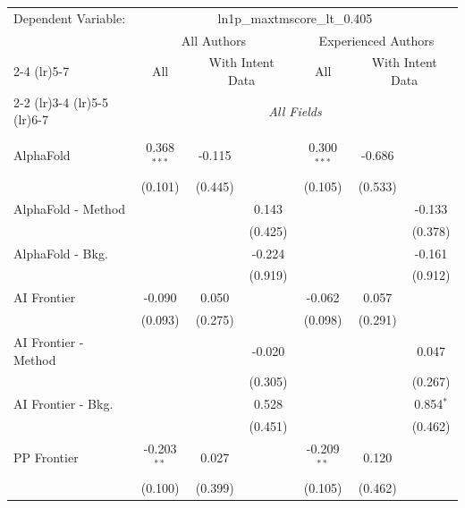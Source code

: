 \begingroup
\centering
\begin{tabular}{lcccccc}
   \tabularnewline \midrule \midrule
   Dependent Variable: & \multicolumn{6}{c}{ln1p\_maxtmscore\_lt\_0.405}\\
 & \multicolumn{3}{c}{All Authors} & \multicolumn{3}{c}{Experienced Authors} \\
\cmidrule(lr){2-4} \cmidrule(lr){5-7}
 & \multicolumn{1}{c}{All} & \multicolumn{2}{c}{With Intent Data} & \multicolumn{1}{c}{All} & \multicolumn{2}{c}{With Intent Data} \\
\cmidrule(lr){2-2} \cmidrule(lr){3-4} \cmidrule(lr){5-5} \cmidrule(lr){6-7}
 & \multicolumn{6}{c}{\textit{All Fields}} \\ \\
   AlphaFold            & 0.368$^{***}$ & -0.115  &         & 0.300$^{***}$ & -0.686  &   \\   
                        & (0.101)       & (0.445) &         & (0.105)       & (0.533) &   \\   
   AlphaFold - Method   &               &         & 0.143   &               &         & -0.133\\   
                        &               &         & (0.425) &               &         & (0.378)\\   
   AlphaFold - Bkg.     &               &         & -0.224  &               &         & -0.161\\   
                        &               &         & (0.919) &               &         & (0.912)\\   
   AI Frontier          & -0.090        & 0.050   &         & -0.062        & 0.057   &   \\   
                        & (0.093)       & (0.275) &         & (0.098)       & (0.291) &   \\   
   AI Frontier - Method &               &         & -0.020  &               &         & 0.047\\   
                        &               &         & (0.305) &               &         & (0.267)\\   
   AI Frontier - Bkg.   &               &         & 0.528   &               &         & 0.854$^{*}$\\   
                        &               &         & (0.451) &               &         & (0.462)\\   
   PP Frontier          & -0.203$^{**}$ & 0.027   &         & -0.209$^{**}$ & 0.120   &   \\   
                        & (0.100)       & (0.399) &         & (0.105)       & (0.462) &   \\   

\end{tabular}
